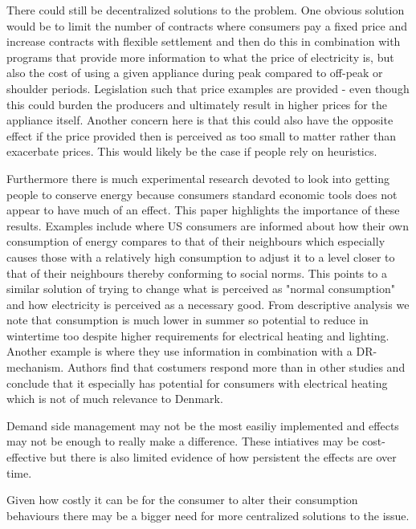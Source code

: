 There could still be decentralized solutions to the problem. One obvious solution would be to limit the number of contracts where consumers pay a fixed price and increase contracts with flexible settlement and then do this in combination with programs that provide more information to what the price of electricity is, but also the cost of using a given appliance during peak compared to off-peak or shoulder periods. Legislation such that price examples are provided - even though this could burden the producers and ultimately result in higher prices for the appliance itself. Another concern here is that this could also have the opposite effect if the price provided then is perceived as too small to matter rather than exacerbate prices. This would likely be the case if people rely on heuristics.
\par

Furthermore there is much experimental research devoted to look into getting people to conserve energy because consumers standard economic tools does not appear to have much of an effect. This paper highlights the importance of these results. Examples include \citep{allcott2011social} where US consumers are informed about how their own consumption of energy compares to that of their neighbours which especially causes those with a relatively high consumption to adjust it to a level closer to that of their neighbours thereby conforming to social norms. This points to a similar solution of trying to change what is perceived as "normal consumption" and how electricity is perceived as a necessary good. From descriptive analysis we note that consumption is much lower in summer so potential to reduce in wintertime too despite higher requirements for electrical heating and lighting. Another example is \citep{saele2011demand} where they use information in combination with a DR-mechanism. Authors find that costumers respond more than in other studies and conclude that it especially has potential for consumers with electrical heating which is not of much relevance to Denmark. 
\par 

Demand side management may not be the most easiliy implemented and effects may not be enough to really make a difference. These intiatives may be cost-effective but there is also limited evidence of how persistent the effects are over time. 

\par %
Given how costly it can be for the consumer to alter their consumption behaviours there may be a bigger need for more centralized solutions to the issue.

